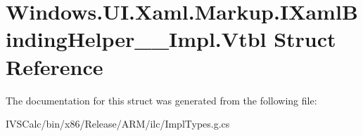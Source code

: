 \hypertarget{struct_windows_1_1_u_i_1_1_xaml_1_1_markup_1_1_i_xaml_binding_helper_____impl_1_1_vtbl}{}\section{Windows.\+U\+I.\+Xaml.\+Markup.\+I\+Xaml\+Binding\+Helper\+\_\+\+\_\+\+Impl.\+Vtbl Struct Reference}
\label{struct_windows_1_1_u_i_1_1_xaml_1_1_markup_1_1_i_xaml_binding_helper_____impl_1_1_vtbl}


The documentation for this struct was generated from the following file\+:\begin{DoxyCompactItemize}
\item 
I\+V\+S\+Calc/bin/x86/\+Release/\+A\+R\+M/ilc/Impl\+Types.\+g.\+cs\end{DoxyCompactItemize}
